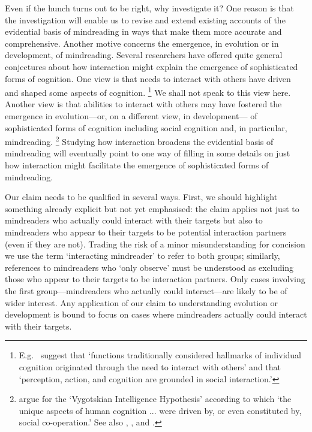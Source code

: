 \documentclass[12pt,a4paper]{extarticle}
\begin{document}
Even if the hunch turns out to be right, why investigate it?
One reason is that the investigation will enable us to revise and extend existing accounts of the evidential basis of mindreading  in ways that make them more accurate and comprehensive.
Another motive concerns the emergence, in evolution or in development, of mindreading.
Several researchers have offered quite general conjectures about how interaction might explain the emergence of sophisticated forms of cognition.
One view is that needs to interact with others have driven and shaped some aspects of cognition.%
\footnote{
E.g.\ \citet[p.\ 103]{Knoblich:2006bn} suggest that 
`functions traditionally considered hallmarks of individual cognition originated through the need to interact with others'
and that
`perception, action, and cognition are grounded in social interaction.'
}
We shall not speak to this view here.
Another view is that abilities to interact with others
may have fostered the emergence in evolution---or, on a different view, in development---%
of sophisticated forms of cognition including social cognition and, in particular, mindreading.%
\footnote{
\citet[p.\ 1]{Moll:2007gu}
argue for the `Vygotskian Intelligence Hypothesis' according to which `the unique aspects of human cognition ... were driven by, or even constituted by, social co-operation.'
See also
	\citet{Hughes:2004zj},
	\citet{Hughes:2006fu},
	\citet{Tomasello:2007gl} and
	\citet{tomasello:2008origins}.
}
Studying how interaction broadens the evidential basis of mindreading will eventually point to one way of filling in some details on just how interaction might facilitate the emergence of sophisticated forms of mindreading.

Our claim needs to be qualified in several ways.
First, we should highlight something already explicit but not yet emphasised:
the claim applies not just to 
 mindreaders who actually could interact with their targets
but also to
 mindreaders who appear to their targets to be potential interaction partners (even if they are not).
Trading the risk of a minor misunderstanding for concision we use the term `interacting mindreader' to refer to both groups;
similarly, references to mindreaders who `only observe' must be understood as excluding those who appear to their targets to be interaction partners.
Only cases involving the first group---mindreaders who actually could interact---are likely to be of wider interest.
Any application of our claim to understanding evolution or development is bound to focus on cases where mindreaders actually could interact with their targets.
\end{document}
